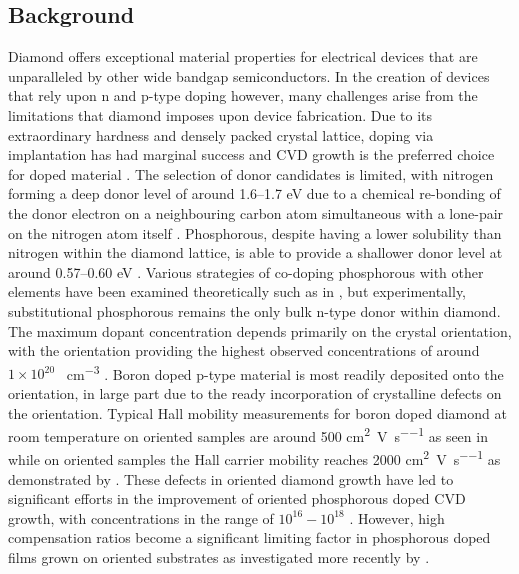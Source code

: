\begin{refsection}
\subsection{Background}
Diamond offers exceptional material properties for electrical devices that are unparalleled by other wide bandgap semiconductors. In the creation of devices that rely upon n and p-type doping however, many challenges arise from the limitations that diamond imposes upon device fabrication. Due to its extraordinary hardness and densely packed crystal lattice, doping via implantation has had marginal success \cite{Das2022-1} and CVD growth is the preferred choice for doped material \cite{Yang2021}. The selection of donor candidates is limited, with nitrogen forming a deep donor level of around 1.6--1.7 \si{\electronvolt} \cite{li1998} due to a chemical re-bonding of the donor electron on a neighbouring carbon atom simultaneous with a lone-pair on the nitrogen atom itself \cite{goss2008}. Phosphorous, despite having a lower solubility than nitrogen within the diamond lattice, is able to provide a shallower donor level at around 0.57--0.60 \si{\electronvolt} \cite{koizumi2000}. Various strategies of co-doping phosphorous with other elements have been examined theoretically such as in \cite{alfieri2018}, but experimentally, substitutional phosphorous remains the only bulk n-type donor within diamond. The maximum dopant concentration depends primarily on the crystal orientation, with the  orientation providing the highest observed concentrations of around $1\times10^{20}$ \si{\atoms\per\centi\metre\cubed} \cite{grotjohn2014}. Boron doped p-type material is most readily deposited onto the  orientation, in large part due to the ready incorporation of crystalline defects on the  orientation. Typical Hall mobility measurements for boron doped diamond at room temperature on  oriented samples are around 500 \si{\cm\squared\per\volt\per\second} as seen in \cite{ri2005} while on  oriented samples the Hall carrier mobility reaches 2000 \si{\cm\squared\per\volt\per\second} as demonstrated by \cite{mortet2008}. These defects in  oriented diamond growth have led to significant efforts in the improvement of  oriented phosphorous doped CVD growth, with concentrations in the range of $10^{16}-10^{18}$ \cite{kato2007}. However, high compensation ratios become a significant limiting factor in phosphorous doped films grown on  oriented substrates as investigated more recently by \cite{stenger2021}.


\end{refsection}
